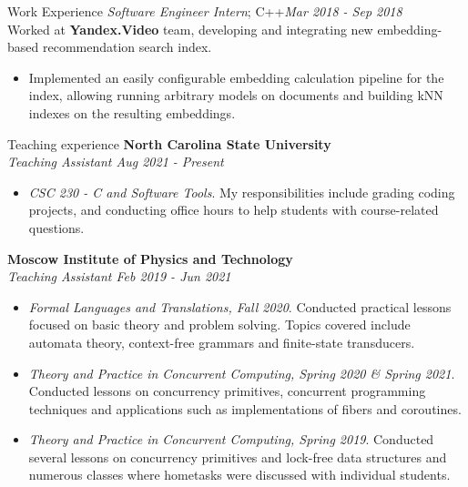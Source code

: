 \documentclass{resume} %
\begin{document}
\begin{rSection}{Work Experience}
{\textit{Software Engineer Intern}; C++}\hfill {\em Mar 2018 - Sep 2018}\\
Worked at \textbf{Yandex.Video} team, developing and integrating new embedding-based recommendation search index.
\begin{itemize}
\vspace{-7pt}
    \item Implemented an easily configurable embedding calculation pipeline for the index, allowing running arbitrary models on documents and building kNN indexes on the resulting embeddings.
\end{itemize}


\pagebreak
\end{rSection}
\begin{rSection}{Teaching experience}
\textbf{North Carolina State University}\\
\textit{Teaching Assistant \hfill Aug 2021 - Present}
\vspace{-7pt}
\begin{itemize}
    \item \textit{CSC 230 - C and Software Tools}. My responsibilities include grading coding projects, and conducting office hours to help students with course-related questions.
\end{itemize}

\textbf{Moscow Institute of Physics and Technology}\\
\textit{Teaching Assistant \hfill Feb 2019 - Jun 2021}
\vspace{-7pt}
\begin{itemize}
    \item \textit{Formal Languages and Translations, Fall 2020}. Conducted practical lessons focused on basic theory and problem solving. Topics covered include automata theory, context-free grammars and finite-state transducers.
\vspace{-7pt}
    \item \textit{Theory and Practice in Concurrent Computing, Spring 2020 \& Spring 2021}. Conducted lessons on concurrency primitives, concurrent programming techniques and applications such as implementations of fibers and coroutines.
\vspace{-7pt}
    \item \textit{Theory and Practice in Concurrent Computing, Spring 2019}. Conducted several lessons on concurrency primitives and lock-free data structures and numerous classes where hometasks were discussed with individual students.
\end{itemize}
\end{rSection}
\end{document}
